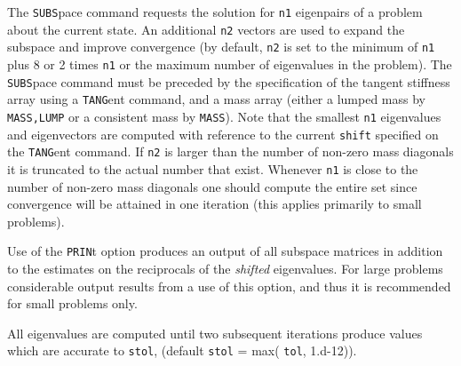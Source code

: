 \headb

The {\tt SUBS}pace command requests the solution for {\tt n1}
eigenpairs of a problem about the current state.  An additional
{\tt n2} vectors are used to expand the subspace and
improve convergence (by default, {\tt n2} is set to the minimum of
{\tt n1} plus 8 or 2 times {\tt n1} or the maximum
number of eigenvalues in the problem).  The {\tt SUBS}pace command
must be preceded by the specification of the tangent stiffness
array using a {\tt TANG}ent command, and a mass array (either
a lumped mass by {\tt MASS,LUMP} or a consistent mass by {\tt MASS}).
Note that the smallest {\tt n1} eigenvalues and eigenvectors are
computed with reference to the current {\tt shift} specified on
the {\tt TANG}ent command.  If {\tt n2} is larger than the number of
non-zero mass diagonals it is truncated to the actual number
that exist.  Whenever {\tt n1} is close to the number of non-zero
mass diagonals one should compute the entire set since
convergence will be attained in one iteration (this applies
primarily to small problems).

Use of the {\tt PRIN}t option produces an output of all subspace
matrices in addition to the estimates on the reciprocals
of the {\it shifted} eigenvalues.  For large problems considerable
output results from a use of this option, and thus it
is recommended for small problems only.

All eigenvalues are computed until two subsequent
iterations produce values which are accurate to {\tt stol},
(default {\tt stol} = max( {\tt tol}, 1.d-12)).
\vfill\eject

